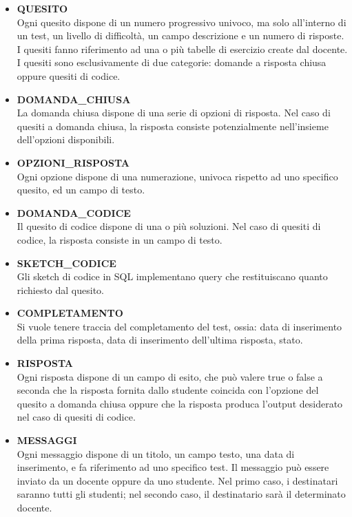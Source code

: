 \documentclass{article}
\begin{document}
\begin{itemize}[label={-}]
    \item \textbf{QUESITO} \vspace*{3px}\\ Ogni quesito dispone di un numero progressivo univoco, ma solo all'interno di un test, un livello di difficoltà, un campo descrizione e un numero di risposte. I quesiti fanno riferimento ad una o più tabelle di esercizio create dal docente. I quesiti sono esclusivamente di due categorie: domande a risposta chiusa oppure quesiti di codice.
    \item \textbf{DOMANDA\_CHIUSA} \vspace*{3px}\\ La domanda chiusa dispone di una serie di opzioni di risposta. Nel caso di quesiti a domanda chiusa, la risposta consiste potenzialmente nell'insieme dell'opzioni disponibili. 
    \item \textbf{OPZIONI\_RISPOSTA} \vspace*{3px}\\ Ogni opzione dispone di una numerazione, univoca rispetto ad uno specifico quesito, ed un campo di testo. 
    \item \textbf{DOMANDA\_CODICE} \vspace*{3px}\\ Il quesito di codice dispone di una o più soluzioni. Nel caso di quesiti di codice, la risposta consiste in un campo di testo.
    \item \textbf{SKETCH\_CODICE} \vspace*{3px}\\ Gli sketch di codice in SQL implementano query che restituiscano quanto richiesto dal quesito.
    \item \textbf{COMPLETAMENTO} \vspace*{3px}\\ Si vuole tenere traccia del completamento del test, ossia: data di inserimento della prima risposta, data di inserimento dell'ultima risposta, stato.
    \item \textbf{RISPOSTA} \vspace*{3px}\\ Ogni risposta dispone di un campo di esito, che può valere true o false a seconda che la risposta fornita dallo studente coincida con l'opzione del quesito a domanda chiusa oppure che la risposta produca l'output desiderato nel caso di quesiti di codice.
    \item \textbf{MESSAGGI} \vspace*{3px}\\ Ogni messaggio dispone di un titolo, un campo testo, una data di inserimento, e fa riferimento ad uno specifico test. Il messaggio può essere inviato da un docente oppure da uno studente. Nel primo caso, i destinatari saranno tutti gli studenti; nel secondo caso, il destinatario sarà il determinato docente.
\end{itemize}
\end{document}
